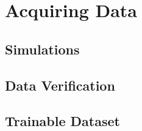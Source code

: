 %
%

\part{Acquiring Data}\label{part:simulation_and_data_verification}

\chapter{Simulations}\label{ch:simulation_and_verification:simulations}


\chapter{Data Verification}\label{ch:simulation_and_verification:data_verification}


\chapter{Trainable Dataset}\label{ch:simulation_and_verification:trainable_dataset}
